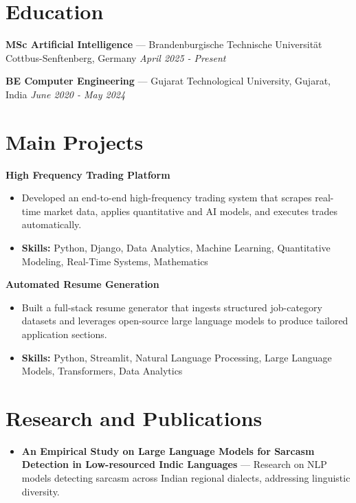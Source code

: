 \documentclass[a4paper,10pt]{article}
\begin{document}
\section*{Education}
\textbf{MSc Artificial Intelligence} — Brandenburgische Technische Universität Cottbus-Senftenberg, Germany \hfill \textit{April 2025 - Present}\par
\vspace{1.5pt}
\textbf{BE Computer Engineering} — Gujarat Technological University, Gujarat, India \hfill \textit{June 2020 - May 2024}\par

\section*{Main Projects}
\textbf{High Frequency Trading Platform}\par
\vspace{1pt}
\begin{itemize}
  \item Developed an end-to-end high-frequency trading system that scrapes real-time market data, applies quantitative and AI models, and executes trades automatically.
  \item \textbf{Skills:} Python, Django, Data Analytics, Machine Learning, Quantitative Modeling, Real-Time Systems, Mathematics
\end{itemize}
\vspace{3pt}
\textbf{Automated Resume Generation}\par
\vspace{1pt}
\begin{itemize}
  \item Built a full-stack resume generator that ingests structured job-category datasets and leverages open-source large language models to produce tailored application sections.
  \item \textbf{Skills:} Python, Streamlit, Natural Language Processing, Large Language Models, Transformers, Data Analytics
\end{itemize}

\section*{Research and Publications}
\begin{itemize}
\item \textbf{An Empirical Study on Large Language Models for Sarcasm Detection in Low-resourced Indic Languages} — Research on NLP models detecting sarcasm across Indian regional dialects, addressing linguistic diversity.
\end{itemize}
\end{document}
